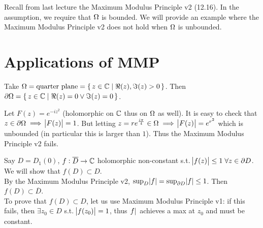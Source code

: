 \setcounter{section}{0}
\setcounter{theorem}{0}


Recall from last lecture the Maximum Modulus Principle v2 (12.16). In the assumption, we require that $\Omega$ is bounded. We will provide an example where the Maximum Modulus Principle v2 does not hold when $\Omega$ is unbounded.

\section{Applications of MMP}

\begin{example}

Take $\Omega = \text{quarter plane} = \set{ z \in \mathbb{C}\mid \Re (z),\Im(z)  > 0 }$. Then $\partial \Omega = \set{z \in \mathbb{C}\mid \Re(z) = 0 \lor \Im(z) = 0}$.



\begin{center}
\end{center}




Let $F(z) = e^{-iz^2}$ (holomorphic on $\mathbb{C}$ thus on $\Omega$ as well). It is easy to check that $z \in \partial \Omega \implies \abs{F(z)} = 1$. But letting $z = re^{\frac{i \pi}{4}} \in \Omega \implies \abs{F(z)} = e^{r^2}$ which is unbounded (in particular this is larger than $1$). Thus the Maximum Modulus Principle v2 fails.

\end{example}

\begin{example}
Say $D= D_1(0)$, $f: \overline{D} \to \mathbb{C}$ holomorphic non-constant s.t. $\abs{f(z)} \leq 1 \; \forall z \in \partial D$. We will show that $f(D) \subset D$.\\

By the Maximum Modulus Principle v2, $\sup_{D} \abs{f} = \sup_{\partial D} \abs{f} \leq 1$. Then $f(D) \subset \overline{D}$.\\

To prove that $f(D) \subset D$, let us use Maximum Modulus Principle v1: if this fails, then $\exists z_0 \in D$ s.t. $\abs{f(z_0)} = 1$, thus $\abs{f}$ achieves a max at $z_0$ and must be constant.
\end{example}


